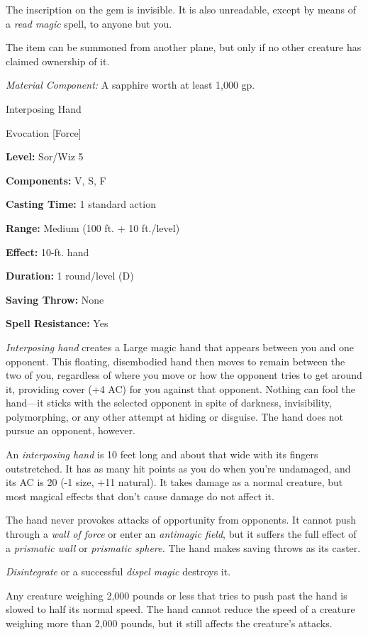 \documentclass{article}
\begin{document}
The inscription on the gem is invisible. It is also unreadable, except by means 
of a \textit{read magic }spell, to anyone but you.

The item can be summoned from another plane, but only if no other creature has 
claimed ownership of it.

\textit{Material Component: }A sapphire worth at least 1,000 gp.

\vspace{12pt}
Interposing Hand

Evocation [Force]

\textbf{Level:} Sor/Wiz 5

\textbf{Components:} V, S, F

\textbf{Casting Time:} 1 standard action

\textbf{Range: }Medium (100 ft. + 10 ft./level)

\textbf{Effect:} 10-ft. hand

\textbf{Duration:} 1 round/level (D)

\textbf{Saving Throw:} None

\textbf{Spell Resistance:} Yes

\textit{Interposing hand }creates a Large magic hand that appears between you and 
one opponent. This floating, disembodied hand then moves to remain between the 
two of you, regardless of where you move or how the opponent tries to get around 
it, providing cover (+4 AC) for you against that opponent. Nothing can fool the 
hand---it sticks with the selected opponent in spite of darkness, invisibility, 
polymorphing, or any other attempt at hiding or disguise. The hand does not pursue 
an opponent, however.

An \textit{interposing hand }is 10 feet long and about that wide with its fingers 
outstretched. It has as many hit points as you do when you're undamaged, and its 
AC is 20 (-1 size, +11 natural). It takes damage as a normal creature, but most 
magical effects that don't cause damage do not affect it.

The hand never provokes attacks of opportunity from opponents. It cannot push through 
a \textit{wall of force }or enter an \textit{antimagic field}, but it suffers the 
full effect of a \textit{prismatic wall }or \textit{prismatic sphere. }The hand 
makes saving throws as its caster.

\textit{Disintegrate }or a successful \textit{dispel magic }destroys it.

Any creature weighing 2,000 pounds or less that tries to push past the hand is 
slowed to half its normal speed. The hand cannot reduce the speed of a creature 
weighing more than 2,000 pounds, but it still affects the creature's attacks.
\end{document}
